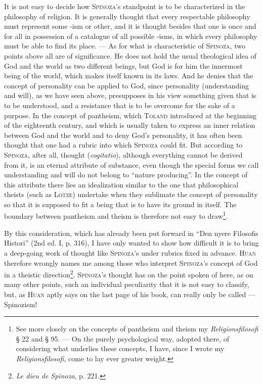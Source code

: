 \documentclass[12pt]{article}
\begin{document}
It is not easy to decide how \textsc{Spinoza}'s standpoint is to be characterized in the
philosophy of religion. It is generally thought that every respectable philosophy must
represent some -ism or other, and it is thought besides that one is once and for all in
possession of a catalogue of all possible -isms, in which every philosophy must be able to
find its place. --- As for what is characteristic of \textsc{Spinoza}, two points above all
are of significance. He does not hold the usual theological idea of God and the world as
two different beings, but God is for him the innermost being of the world, which makes
itself known in its laws. And he denies that the concept of personality can be applied to
God, since personality (understanding and will), as we have seen above, presupposes in his
view something given that is to be understood, and a resistance that is to be overcome for
the sake of a purpose. In the concept of pantheism, which \textsc{Toland} introduced at the
beginning of the eighteenth century, and which is usually taken to express an inner
relation between God and the world and to deny God's personality, it has often been
thought that one had a rubric into which \textsc{Spinoza} could fit. But according to
\textsc{Spinoza}, after all, thought (\textit{cogitatio}), although everything cannot be
derived from it, is an eternal attribute of substance, even though the special forms we
call understanding and will do not belong to ``nature producing''. In the concept of this
attribute there lies an idealization similar to the one that philosophical theists (such
as \textsc{Lotze}) undertake when they sublimate the concept of personality so that it is
supposed to fit a being that is to have its ground in itself. The boundary between
pantheism and theism is therefore not easy to draw\footnote{See more closely on the
concepts of pantheism and theism my \textit{Religionsfilosofi} § 22 and § 95. --- On the
purely psychological way, adopted there, of considering what underlies these concepts, I
have, since I wrote my \textit{Religionsfilosofi}, come to lay ever greater weight.}.

By this consideration, which has already been put forward in ``Den nyere Filosofis
Histori'' (2nd ed. I, p. 316), I have only wanted to show how difficult it is to bring a
deep-going work of thought like \textsc{Spinoza}'s under rubrics fixed in advance.
\textsc{Huan} therefore wrongly names me among those who interpret \textsc{Spinoza}'s
concept of God in a theistic direction\footnote{\textit{Le dieu de Spinoza}, p. 221.}.
\textsc{Spinoza}'s thought has on the point spoken of here, as on many other points, such
an individual peculiarity that it is not easy to classify, but, as \textsc{Huan} aptly
says on the last page of his book, can really only be called --- Spinozism!
\end{document}

